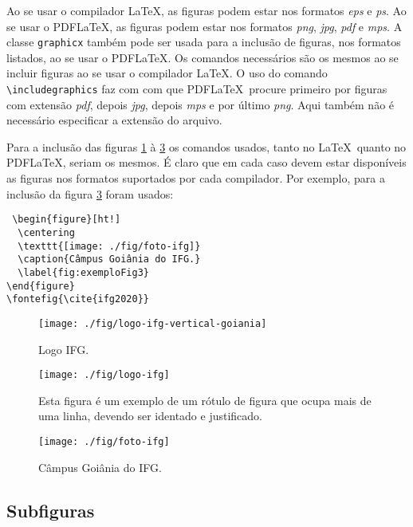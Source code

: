 Ao se usar o compilador \LaTeX, as figuras podem estar nos formatos \textit{eps} e \textit{ps}. Ao se usar o PDF\LaTeX, as figuras podem estar nos formatos \textit{png}, \textit{jpg}, \textit{pdf} e \textit{mps}. A classe \verb|graphicx| também pode ser usada para a inclusão de figuras, nos formatos listados, ao se usar o PDF\LaTeX. Os comandos necessários são os mesmos ao se incluir figuras ao se usar o compilador \LaTeX. O uso do comando \verb|\includegraphics| faz com com que PDF\LaTeX\ procure primeiro por figuras com extensão \textit{pdf}, depois \textit{jpg}, depois \textit{mps} e por último \textit{png}. Aqui também não é necessário especificar a extensão do arquivo.

Para a inclusão das figuras \ref{fig:exemploFig1} à \ref{fig:exemploFig3} os comandos usados, tanto no \LaTeX\ quanto no PDF\LaTeX, seriam os mesmos. É claro que em cada caso devem estar disponíveis as figuras nos formatos suportados por cada compilador. Por exemplo, para a inclusão da figura \ref{fig:exemploFig3} foram usados:
\begin{verbatim}
 \begin{figure}[ht!]
  \centering
  \texttt{[image: ./fig/foto-ifg]}
  \caption{Câmpus Goiânia do IFG.}
  \label{fig:exemploFig3}
\end{figure}
\fontefig{\cite{ifg2020}}
\end{verbatim}

\begin{figure}[ht!]
 \centering
  \texttt{[image: ./fig/logo-ifg-vertical-goiania]}
 \caption{Logo IFG.}
 \label{fig:exemploFig1}
\end{figure}

\begin{figure}[ht!]
 \centering
 \texttt{[image: ./fig/logo-ifg]}
 \caption[Esta figura é um exemplo de um rótulo de figura]{Esta figura é um exemplo de um rótulo de figura que ocupa mais de uma linha, devendo ser identado e justificado.}
 \label{fig:exemploFig2}
\end{figure}

\begin{figure}[H]
 \centering
  \texttt{[image: ./fig/foto-ifg]}
  \caption{Câmpus Goiânia do IFG.}
 \label{fig:exemploFig3}
\end{figure}

\subsection{Subfiguras}
\label{subsec:subfigs} 

